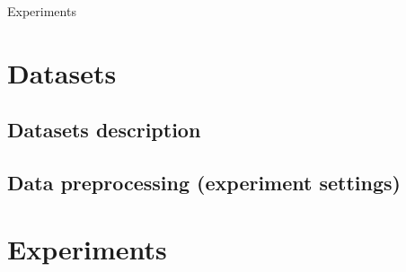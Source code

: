 Experiments


\section{Datasets}


\subsection{Datasets description}

\subsection{Data preprocessing (experiment settings)}


\section{Experiments}
